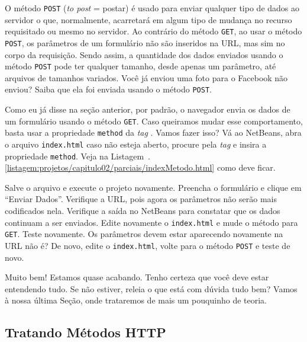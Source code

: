 O método \texttt{POST} (\textit{to post} = postar) é usado para enviar qualquer tipo de dados ao servidor o que, normalmente, acarretará em algum tipo de mudança no recurso requisitado ou mesmo no servidor. Ao contrário do método \texttt{GET}, ao usar o método \texttt{POST}, os parâmetros de um formulário não são inseridos na URL, mas sim no corpo da requisição. Sendo assim, a quantidade dos dados enviados usando o método \texttt{POST} pode ter qualquer tamanho, desde apenas um parâmetro, até arquivos de tamanhos variados. Você já enviou uma foto para o Facebook não enviou? Saiba que ela foi enviada usando o método \texttt{POST}.

Como eu já disse na seção anterior, por padrão, o navegador envia os dados de um formulário usando o método \texttt{GET}. Caso queiramos mudar esse comportamento, basta usar a propriedade \texttt{method} da \textit{tag} . Vamos fazer isso? Vá ao NetBeans, abra o arquivo \texttt{index.html} caso não esteja aberto, procure pela \textit{tag}  e insira a propriedade \texttt{method}. Veja na Listagem~\thechapter.\ref{listagem:projetos/capitulo02/parciais/indexMetodo.html} como deve ficar.


Salve o arquivo e execute o projeto novamente. Preencha o formulário e clique em ``Enviar Dados''. Verifique a URL, pois agora os parâmetros não serão mais codificados nela. Verifique a saída no NetBeans para constatar que os dados continuam a ser enviados. Edite novamente o \texttt{index.html} e mude o método para \texttt{GET}. Teste novamente. Os parâmetros devem estar aparecendo novamente na URL não é? De novo, edite o \texttt{index.html}, volte para o método \texttt{POST} e teste de novo.

Muito bem! Estamos quase acabando. Tenho certeza que você deve estar entendendo tudo. Se não estiver, releia o que está com dúvida tudo bem? Vamos à nossa última Seção, onde trataremos de mais um pouquinho de teoria.



\subsection{Tratando Métodos HTTP}

